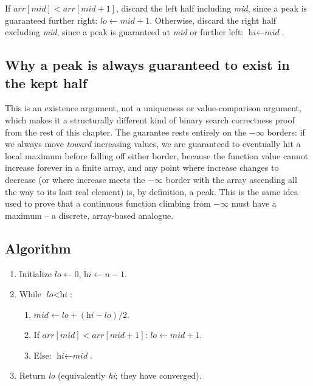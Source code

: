 \begin{ideabox}
If $\textit{arr}[\textit{mid}] < \textit{arr}[\textit{mid}+1]$, discard the
left half including \textit{mid}, since a peak is guaranteed further
right: $\textit{lo} \gets \textit{mid}+1$. Otherwise, discard the right
half excluding \textit{mid}, since a peak is guaranteed at \textit{mid} or
further left: $\textit{hi} \gets \textit{mid}$.
\end{ideabox}

\subsection*{Why a peak is always guaranteed to exist in the kept half}

This is an existence argument, not a uniqueness or value-comparison
argument, which makes it a structurally different kind of binary search
correctness proof from the rest of this chapter. The guarantee rests
entirely on the $-\infty$ borders: if we always move \emph{toward}
increasing values, we are guaranteed to eventually hit a local maximum
before falling off either border, because the function value cannot
increase forever in a finite array, and any point where increase changes
to decrease (or where increase meets the $-\infty$ border with the array
ascending all the way to its last real element) is, by definition, a peak.
This is the same idea used to prove that a continuous function climbing
from $-\infty$ must have a maximum -- a discrete, array-based analogue.

\subsection*{Algorithm}

\begin{enumerate}
  \item Initialize $\textit{lo} \gets 0$, $\textit{hi} \gets n-1$.
  \item While $\textit{lo} < \textit{hi}$:
  \begin{enumerate}
    \item $\textit{mid} \gets \textit{lo}+(\textit{hi}-\textit{lo})/2$.
    \item If $\textit{arr}[\textit{mid}] < \textit{arr}[\textit{mid}+1]$:
          $\textit{lo} \gets \textit{mid}+1$.
    \item Else: $\textit{hi} \gets \textit{mid}$.
  \end{enumerate}
  \item Return \textit{lo} (equivalently \textit{hi}; they have converged).
\end{enumerate}

